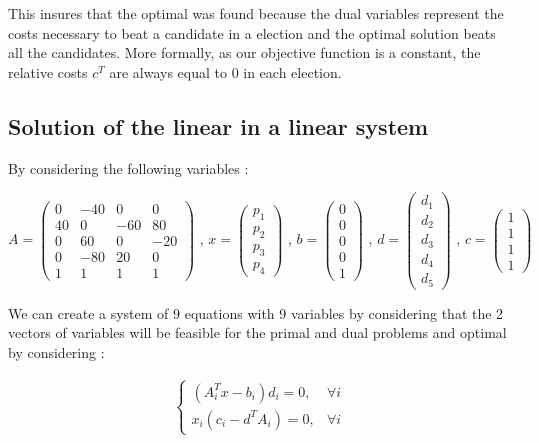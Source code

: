This insures that the optimal was found because the dual variables represent the costs necessary to beat a candidate in a election and the optimal solution beats all the candidates. More formally, as our objective function is a constant, the relative costs $c^T$ are always equal to $0$ in each election. 

\subsection{Solution of the linear in a linear system}
By considering the following variables : 

$$A = \begin{pmatrix}0 & -40 & 0 & 0\\40 & 0 & -60 & 80\\0 & 60 & 0 & -20\\0 & -80 & 20 & 0\\1 & 1 & 1 & 1\end{pmatrix} 
\text{ , } 
x = \begin{pmatrix}p_1\\p_2\\p_3\\p_4\end{pmatrix} 
\text{ , } 
b = \begin{pmatrix}0\\0\\0\\0\\1\end{pmatrix}
\text{ , } 
d = \begin{pmatrix}d_1\\d_2\\d_3\\d_4\\d_5\end{pmatrix}
\text{ , }
c = \begin{pmatrix}1\\1\\1\\1\end{pmatrix}$$

We can create a system of 9 equations with 9 variables by considering that the 2 vectors of variables will be feasible for the primal and dual problems and optimal by considering : 

$$\begin{aligned}\begin{cases}
    \left(A^T_ix-b_i\right)d_i=0, &\forall i\\
    x_i\left(c_i-d^TA_i\right)=0, &\forall i
\end{cases}\end{aligned}$$

